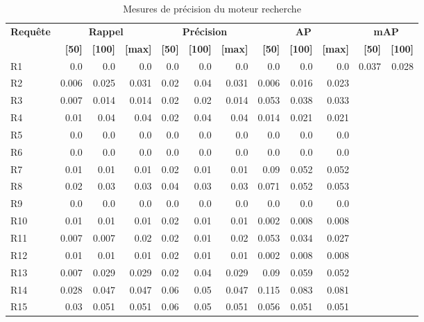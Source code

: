 \begin{table}[H]
\centering
\begin{tabular}{l|rrr|rrr|rrr|rr}
\toprule
\textbf{Requête} & \multicolumn{3}{c}{\textbf{Rappel}} & \multicolumn{3}{c}{\textbf{Précision}} & \multicolumn{3}{c}{\textbf{AP}} & \multicolumn{2}{c}{\textbf{mAP}} \\
 & \textbf{[50]} & \textbf{[100]} & \textbf{[max]} & \textbf{[50]} & \textbf{[100]} & \textbf{[max]} & \textbf{[50]} & \textbf{[100]} & \textbf{[max]} & \textbf{[50]} & \textbf{[100]} \\
\midrule
R1 & 0.0 & 0.0 & 0.0 & 0.0 & 0.0 & 0.0 & 0.0 & 0.0 & 0.0 & \multirow{15}{*}{0.037} & \multirow{15}{*}{0.028} \\
R2 & 0.006 & 0.025 & 0.031 & 0.02 & 0.04 & 0.031 & 0.006 & 0.016 & 0.023 \\
R3 & 0.007 & 0.014 & 0.014 & 0.02 & 0.02 & 0.014 & 0.053 & 0.038 & 0.033 \\
R4 & 0.01 & 0.04 & 0.04 & 0.02 & 0.04 & 0.04 & 0.014 & 0.021 & 0.021 \\
R5 & 0.0 & 0.0 & 0.0 & 0.0 & 0.0 & 0.0 & 0.0 & 0.0 & 0.0 \\
R6 & 0.0 & 0.0 & 0.0 & 0.0 & 0.0 & 0.0 & 0.0 & 0.0 & 0.0 \\
R7 & 0.01 & 0.01 & 0.01 & 0.02 & 0.01 & 0.01 & 0.09 & 0.052 & 0.052 \\
R8 & 0.02 & 0.03 & 0.03 & 0.04 & 0.03 & 0.03 & 0.071 & 0.052 & 0.053 \\
R9 & 0.0 & 0.0 & 0.0 & 0.0 & 0.0 & 0.0 & 0.0 & 0.0 & 0.0 \\
R10 & 0.01 & 0.01 & 0.01 & 0.02 & 0.01 & 0.01 & 0.002 & 0.008 & 0.008 \\
R11 & 0.007 & 0.007 & 0.02 & 0.02 & 0.01 & 0.02 & 0.053 & 0.034 & 0.027 \\
R12 & 0.01 & 0.01 & 0.01 & 0.02 & 0.01 & 0.01 & 0.002 & 0.008 & 0.008 \\
R13 & 0.007 & 0.029 & 0.029 & 0.02 & 0.04 & 0.029 & 0.09 & 0.059 & 0.052 \\
R14 & 0.028 & 0.047 & 0.047 & 0.06 & 0.05 & 0.047 & 0.115 & 0.083 & 0.081 \\
R15 & 0.03 & 0.051 & 0.051 & 0.06 & 0.05 & 0.051 & 0.056 & 0.051 & 0.051 \\
\bottomrule
\end{tabular}
\caption{Mesures de précision du moteur recherche}
\label{tab:results}
\end{table}
